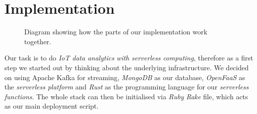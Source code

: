 \section{Implementation}

\begin{figure}[H]
  \caption{
    Diagram showing how the parts of our implementation work together.
    \cite{smartphone-icon, browser-icon}
  }
\end{figure}

Our task is to do \textit{IoT data analytics with serverless computing}, therefore as a first step
we started out by thinking about the underlying infrastructure. We decided on using Apache Kafka for
streaming, \textit{MongoDB} as our database, \textit{OpenFaaS} as the \textit{serverless platform} and
\textit{Rust} as the programming language for our \textit{serverless functions}. The whole stack can then be
initialised via \textit{Ruby Rake} file, which acts as our main deployment script.









